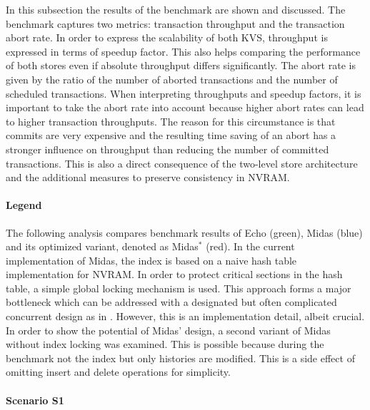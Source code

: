 In this subsection the results of the benchmark are shown and discussed. The
benchmark captures two metrics: transaction throughput and the transaction abort
rate. In order to express the scalability of both KVS, throughput is expressed
in terms of speedup factor. This also helps comparing the performance of both
stores even if absolute throughput differs significantly. The abort rate is
given by the ratio of the number of aborted transactions and the number of
scheduled transactions. When interpreting throughputs and speedup factors, it is
important to take the abort rate into account because higher abort rates can
lead to higher transaction throughputs. The reason for this circumstance is that
commits are very expensive and the resulting time saving of an abort has a
stronger influence on throughput than reducing the number of committed
transactions. This is also a direct consequence of the two-level store
architecture and the additional measures to preserve consistency in NVRAM.

\paragraph{Legend}

The following analysis compares benchmark results of Echo (green), Midas (blue)
and its optimized variant, denoted as Midas$^{*}$ (red). In the current
implementation of Midas, the index is based on a naive hash table implementation
for NVRAM. In order to protect critical sections in the hash table, a simple
global locking mechanism is used. This approach forms a major bottleneck which
can be addressed with a designated but often complicated concurrent design as in
\cite{fan2013memc3}. However, this is an implementation detail, albeit crucial.
In order to show the potential of Midas' design, a second variant of Midas
without index locking was examined. This is possible because during the
benchmark not the index but only histories are modified. This is a side effect
of omitting insert and delete operations for simplicity.


\clearpage

\paragraph{Scenario S1}

